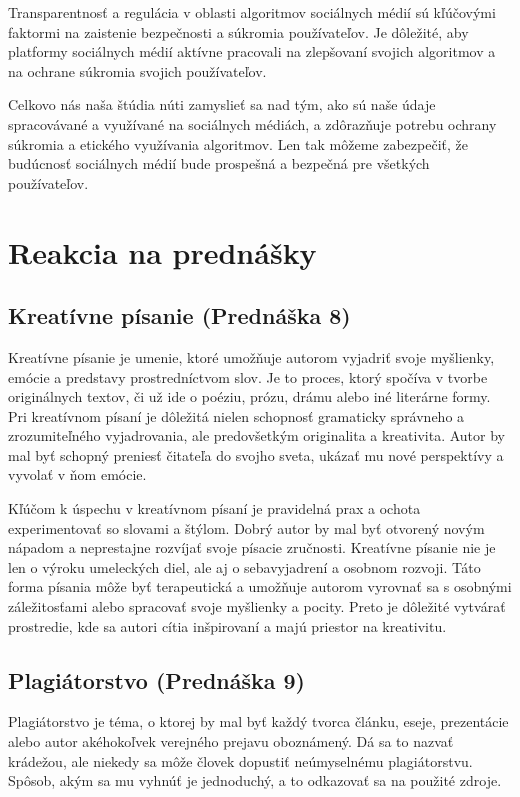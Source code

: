 \documentclass[12pt,twoside,slovak,a4paper]{article}
\begin{document}
Transparentnosť a regulácia v oblasti algoritmov sociálnych médií sú kľúčovými faktormi na zaistenie bezpečnosti a súkromia používateľov. Je dôležité, aby platformy sociálnych médií aktívne pracovali na zlepšovaní svojich algoritmov a na ochrane súkromia svojich používateľov.

Celkovo nás naša štúdia núti zamyslieť sa nad tým, ako sú naše údaje spracovávané a využívané na sociálnych médiách, a zdôrazňuje potrebu ochrany súkromia a etického využívania algoritmov. Len tak môžeme zabezpečiť, že budúcnosť sociálnych médií bude prospešná a bezpečná pre všetkých používateľov.




\section{Reakcia na prednášky}

\subsection{Kreatívne písanie (Prednáška 8)}

Kreatívne písanie je umenie, ktoré umožňuje autorom vyjadriť svoje myšlienky, emócie a predstavy prostredníctvom slov. Je to proces, ktorý spočíva v tvorbe originálnych textov, či už ide o poéziu, prózu, drámu alebo iné literárne formy. Pri kreatívnom písaní je dôležitá nielen schopnosť gramaticky správneho a zrozumiteľného vyjadrovania, ale predovšetkým originalita a kreativita. Autor by mal byť schopný preniesť čitateľa do svojho sveta, ukázať mu nové perspektívy a vyvolať v ňom emócie.

Kľúčom k úspechu v kreatívnom písaní je pravidelná prax a ochota experimentovať so slovami a štýlom. Dobrý autor by mal byť otvorený novým nápadom a neprestajne rozvíjať svoje písacie zručnosti. Kreatívne písanie nie je len o výroku umeleckých diel, ale aj o sebavyjadrení a osobnom rozvoji. Táto forma písania môže byť terapeutická a umožňuje autorom vyrovnať sa s osobnými záležitosťami alebo spracovať svoje myšlienky a pocity. Preto je dôležité vytvárať prostredie, kde sa autori cítia inšpirovaní a majú priestor na kreativitu.

\subsection{Plagiátorstvo (Prednáška 9)}
Plagiátorstvo je téma, o ktorej by mal byť každý tvorca článku, eseje, prezentácie alebo autor akéhokoľvek verejného prejavu oboznámený. Dá sa to nazvať krádežou, ale niekedy sa môže človek dopustiť neúmyselnému plagiátorstvu. Spôsob, akým sa mu vyhnúť je jednoduchý, a to odkazovať sa na použité zdroje.
\end{document}

